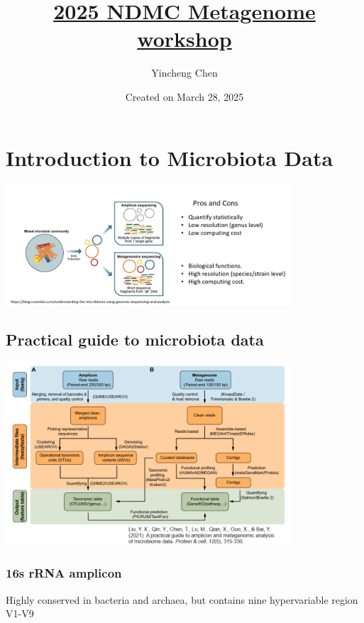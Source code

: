 \documentclass[
]{article}
\title{\href{https://yinchengchen23.github.io/2025_Metagenome_workshop/}{2025
NDMC Metagenome workshop}}
\author{Yincheng Chen}
\date{Created on March 28, 2025}
\begin{document}
\maketitle

{
\setcounter{tocdepth}{2}
\tableofcontents
}
\hypertarget{introduction-to-microbiota-data}{%
\section{Introduction to Microbiota
Data}\label{introduction-to-microbiota-data}}

\includegraphics[width=0.8\textwidth,height=\textheight]{images/Fig1.png}

\hypertarget{practical-guide-to-microbiota-data}{%
\subsection{Practical guide to microbiota
data}\label{practical-guide-to-microbiota-data}}

\includegraphics[width=0.8\textwidth,height=\textheight]{images/Fig2.png}

\hypertarget{s-rrna-amplicon}{%
\subsubsection{16s rRNA amplicon}\label{s-rrna-amplicon}}

Highly conserved in bacteria and archaea, but contains nine
hypervariable region V1-V9
\end{document}
